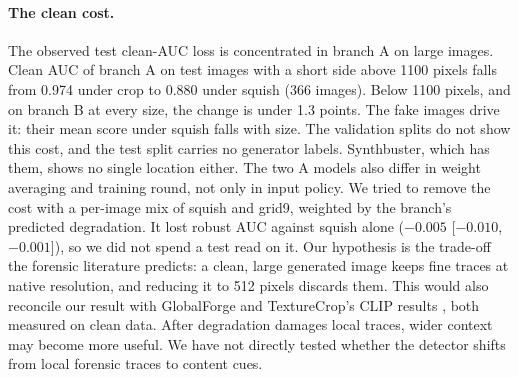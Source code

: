 \documentclass[letterpaper]{article} %
\begin{document}
\paragraph{The clean cost.} The observed test clean-AUC loss is concentrated
in branch A on large images.
Clean AUC of branch A on test images with a short side above 1100 pixels
falls from 0.974 under crop to 0.880 under squish (366 images). Below 1100
pixels, and on branch B at every size, the change is under 1.3 points. The
fake images drive it: their mean score under squish falls with size. The
validation splits do not show this cost, and the test split carries no
generator labels. Synthbuster, which has them, shows no single location
either. The two A models also differ in weight averaging and training round,
not only in input policy. We tried to remove the cost with a per-image mix of
squish and grid9, weighted by the branch's predicted degradation. It lost
robust AUC against squish alone ($-0.005$ [$-0.010$, $-0.001$]), so we did
not spend a test read on it. Our hypothesis is the trade-off the forensic
literature predicts: a clean, large generated image keeps fine traces at
native resolution, and reducing it to 512 pixels discards them. This would
also reconcile our result with GlobalForge \cite{cui2026globalforge} and
TextureCrop's CLIP results \cite{konstantinidou2025texturecrop}, both
measured on clean data. After degradation damages local traces, wider context may become more
useful. We have not directly tested whether the detector shifts from
local forensic traces to content cues.
\end{document}
